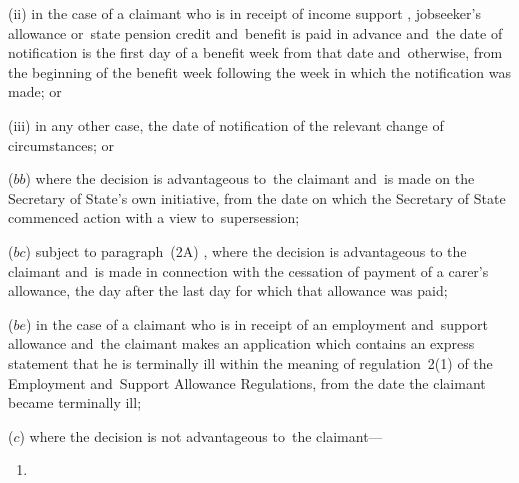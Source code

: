 \documentclass[12pt,a4paper]{article}
\begin{document}
\begin{enumerate}
\begin{enumerate}
(ii) in the case of a claimant who is in receipt of income support%
, jobseeker's allowance or~state pension credit  %
and~benefit is paid in advance and~the date of notification is the first day of a benefit week from that date and~otherwise, from the beginning of the benefit week following the week in which the notification was made; or

(iii) in any other case, the date of notification of the relevant change of circumstances; or
\end{enumerate}

($bb$) where the decision is advantageous to~the claimant and~is made on the Secretary of State’s own initiative, from the date on which the Secretary of State commenced action with a view to~supersession;

($bc$) 
subject to 
paragraph~(2A)%
,  %
where the decision is advantageous to the claimant and~is made in connection with the cessation of payment of a carer’s allowance, the day after the last day for which that allowance was paid;


($be$) in the case of a claimant who is in receipt of an employment and~support allowance and~the claimant makes an application which contains an express statement that he is terminally ill within the meaning of regulation~2(1) of the Employment and~Support Allowance Regulations, from the date the claimant became terminally ill;

($c$) where the decision is not advantageous to~the claimant—
\begin{enumerate}\item[]


\end{enumerate}
\end{enumerate}
\end{document}
